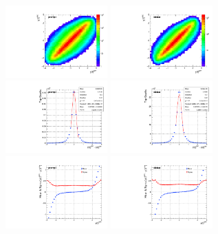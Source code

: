 \begin{figure}
  \begin{center}
    \includegraphics[width=0.35\textwidth]{fig_fullRun2UL/KinRecoResolutions/top_rapidity_genreco_prompt.pdf}
    \includegraphics[width=0.35\textwidth]{fig_fullRun2UL/KinRecoResolutions/top_rapidity_genreco_viatau.pdf}\\
    \includegraphics[width=0.35\textwidth]{fig_fullRun2UL/KinRecoResolutions/top_rapidity_residual_prompt.pdf}
    \includegraphics[width=0.35\textwidth]{fig_fullRun2UL/KinRecoResolutions/top_rapidity_residual_viatau.pdf}\\
    \includegraphics[width=0.35\textwidth]{fig_fullRun2UL/KinRecoResolutions/top_rapidity_multiresidual_prompt.pdf}
    \includegraphics[width=0.35\textwidth]{fig_fullRun2UL/KinRecoResolutions/top_rapidity_multiresidual_viatau.pdf}\\

\end{center}
\end{figure}
